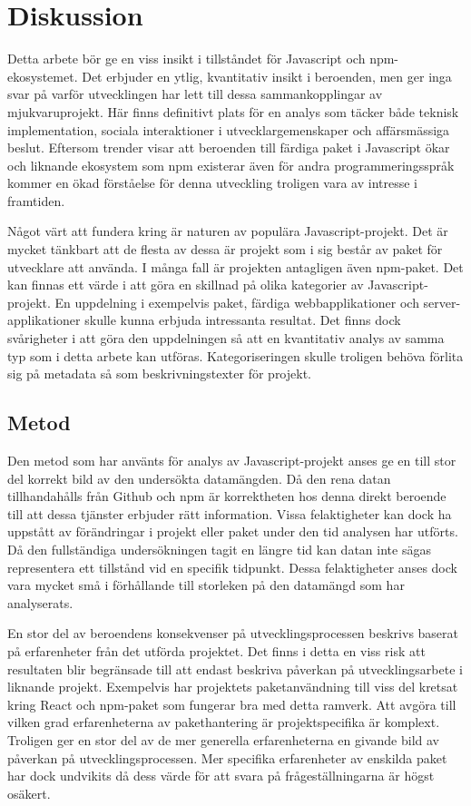 \section{Diskussion}
\label{sec:joel_o-discussion}
Detta arbete bör ge en viss insikt i tillståndet för Javascript och npm-ekosystemet. Det erbjuder en ytlig, kvantitativ insikt i beroenden, men ger inga svar på varför utvecklingen har lett till dessa sammankopplingar av mjukvaruprojekt. Här finns definitivt plats för en analys som täcker både teknisk implementation, sociala interaktioner i utvecklargemenskaper och affärsmässiga beslut. Eftersom trender visar att beroenden till färdiga paket i Javascript ökar~\cite{Wittern:2016} och liknande ekosystem som npm existerar även för andra programmeringsspråk kommer en ökad förståelse för denna utveckling troligen vara av intresse i framtiden.

Något värt att fundera kring är naturen av populära Javascript-projekt. Det är mycket tänkbart att de flesta av dessa är projekt som i sig består av paket för utvecklare att använda. I många fall är projekten antagligen även npm-paket. Det kan finnas ett värde i att göra en skillnad på olika kategorier av Javascript-projekt. En uppdelning i exempelvis paket, färdiga webbapplikationer och server-applikationer skulle kunna erbjuda intressanta resultat. Det finns dock svårigheter i att göra den uppdelningen så att en kvantitativ analys av samma typ som i detta arbete kan utföras. Kategoriseringen skulle troligen behöva förlita sig på metadata så som beskrivningstexter för projekt.

\subsection{Metod}
\label{subsec:joel_o-discussion-method}
Den metod som har använts för analys av Javascript-projekt anses ge en till stor del korrekt bild av den undersökta datamängden. Då den rena datan tillhandahålls från Github och npm är korrektheten hos denna direkt beroende till att dessa tjänster erbjuder rätt information. Vissa felaktigheter kan dock ha uppstått av förändringar i projekt eller paket under den tid analysen har utförts. Då den fullständiga undersökningen tagit en längre tid kan datan inte sägas representera ett tillstånd vid en specifik tidpunkt. Dessa felaktigheter anses dock vara mycket små i förhållande till storleken på den datamängd som har analyserats.

En stor del av beroendens konsekvenser på utvecklingsprocessen beskrivs baserat på erfarenheter från det utförda projektet. Det finns i detta en viss risk att resultaten blir begränsade till att endast beskriva påverkan på utvecklingsarbete i liknande projekt. Exempelvis har projektets paketanvändning till viss del kretsat kring React och npm-paket som fungerar bra med detta ramverk. Att avgöra till vilken grad erfarenheterna av pakethantering är projektspecifika är komplext. Troligen ger en stor del av de mer generella erfarenheterna en givande bild av påverkan på utvecklingsprocessen. Mer specifika erfarenheter av enskilda paket har dock undvikits då dess värde för att svara på frågeställningarna är högst osäkert.

